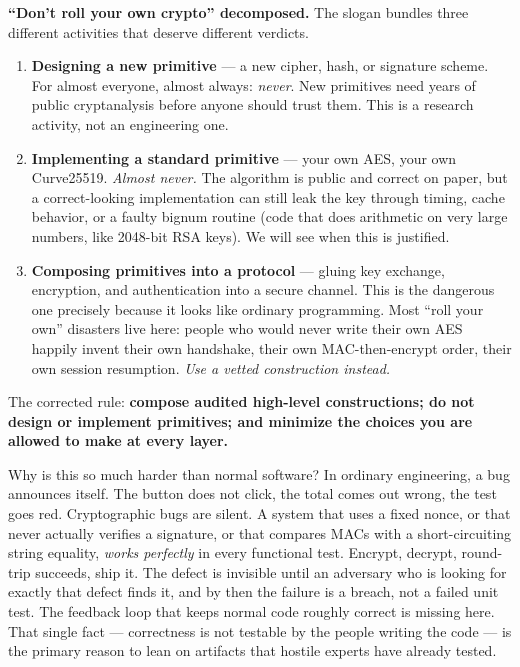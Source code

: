 \begin{focusbox}
\textbf{``Don't roll your own crypto'' decomposed.} The slogan bundles three
different activities that deserve different verdicts.
\begin{enumerate}
  \item \textbf{Designing a new primitive} --- a new cipher, hash, or signature
  scheme. For almost everyone, almost always: \emph{never}. New primitives need
  years of public cryptanalysis before anyone should trust them. This is a
  research activity, not an engineering one.
  \item \textbf{Implementing a standard primitive} --- your own AES, your own
  Curve25519. \emph{Almost never.} The algorithm is public and correct on paper,
  but a correct-looking implementation can still leak the key through timing,
  cache behavior, or a faulty bignum routine (code that does arithmetic on very large
  numbers, like 2048-bit RSA keys). We will see when this is justified.
  \item \textbf{Composing primitives into a protocol} --- gluing key exchange,
  encryption, and authentication into a secure channel. This is the dangerous one
  precisely because it looks like ordinary programming. Most ``roll your own''
  disasters live here: people who would never write their own AES happily invent
  their own handshake, their own MAC-then-encrypt order, their own session
  resumption. \emph{Use a vetted construction instead.}
\end{enumerate}
The corrected rule: \textbf{compose audited high-level constructions; do not
design or implement primitives; and minimize the choices you are allowed to make
at every layer.}
\end{focusbox}

Why is this so much harder than normal software? In ordinary engineering, a bug
announces itself. The button does not click, the total comes out wrong, the test
goes red. Cryptographic bugs are silent. A system that uses a fixed nonce, or that
never actually verifies a signature, or that compares MACs with a short-circuiting
string equality, \emph{works perfectly} in every functional test. Encrypt,
decrypt, round-trip succeeds, ship it. The defect is invisible until an adversary
who is looking for exactly that defect finds it, and by then the failure is a
breach, not a failed unit test. The feedback loop that keeps normal code roughly
correct is missing here. That single fact --- correctness is not testable by the
people writing the code --- is the primary reason to lean on artifacts that
hostile experts have already tested.

